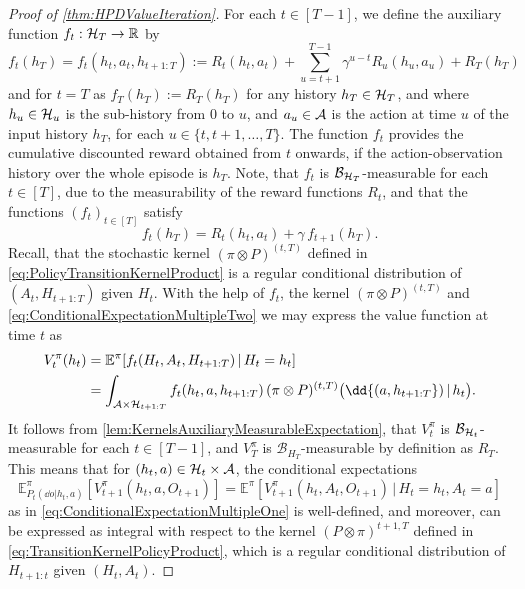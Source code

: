 \documentclass[
    a4paper,
    11pt,
    bibliography=totoc,
    listof=totoc,      
    headinclude=true,
    cleardoublepage=empty,
]{scrbook}
\theoremstyle{plain}
\theoremstyle{definition}
\theoremstyle{remark}
\newcommand{\SetR}{\mathbb R}
\newcommand{\E}{\mathbb E}
\newcommand{\SpaceA}{{\cal A}}
\newcommand{\SpaceH}{{\cal H}}
\begin{document}
\begin{proof}[Proof of \cref{thm:HPDValueIteration}]
    For each $t\in[T-1]$, we define the auxiliary function $f_t:\SpaceH_T \to 
    \SetR$ by
    \begin{equation}
    \label{eq:AuxiliaryRewardFunction}
        f_t(h_T) = f_t(h_{t},a_t,h_{t+1:T}) 
        := R_t(h_t,a_t) + \sum_{u=t+1}^{T-1} 
            \gamma^{u-t} R_u(h_u,a_u) + R_T(h_T)
    \end{equation}
    and for $t=T$ as $f_T(h_T) := R_T(h_T)$ for any history $h_T\in\SpaceH_T$, 
    and where $h_u\in\SpaceH_u$ is the sub-history from $0$ to $u$, and
    $a_u\in\SpaceA$ is the action at time $u$ of the input history $h_T$, for 
    each $u\in\{t, t+1,\dots, T\}$. The function $f_t$ provides the cumulative 
    discounted reward obtained from $t$ onwards, if the action-observation 
    history over the whole episode is $h_T$. Note, that $f_t$ is 
    $\mathcal{B}_{\SpaceH_T}$-measurable for each $t\in[T]$, due to the 
    measurability of the reward functions $R_t$, and that the functions 
    $(f_t)_{t\in[T]}$ satisfy
    \begin{equation}    
    \label{eq:AuxiliaryRewardFunctionRecursion}
        f_t(h_T) = R_t(h_t,a_t) + \gamma\, f_{t+1}(h_T).
    \end{equation}
    Recall, that the stochastic kernel $(\pi\otimes P)^{(t,T)}$ defined in 
    \cref{eq:PolicyTransitionKernelProduct} is a regular conditional 
    distribution of $(A_t,H_{t+1:T})$ given $H_t$. With the help of $f_t$, the 
    kernel $(\pi\otimes P)^{(t,T)}$ and 
    \cref{eq:ConditionalExpectationMultipleTwo} we may express the value 
    function at time $t$ as
    \begin{equation}   
    \label{eq:HDPValueFunctionIntegral}
    \begin{split}
    V^{\pi}_t(h_t) 
    &= \E^\pi[f_t(H_t,A_t,H_{t+1:T}) \,|\, H_t=h_t] \\
    &= \int_{\SpaceA\times\SpaceH_{t+1:T}}
            f_t(h_t, a, h_{t+1:T})\, 
                (\pi\otimes P)^{(t,T)}\bigl(\dd{(a,h_{t+1:T}}) \,|\, h_t\bigr).
    \end{split}
    \end{equation}
    It follows from \cref{lem:KernelsAuxiliaryMeasurableExpectation}, that 
    $V^\pi_t$ is $\mathcal{B}_{\SpaceH_t}$-measurable for each $t\in[T-1]$, 
    and $V^\pi_T$ is $\mathcal{B}_{H_T}$-measurable by definition as $R_T$.
    This means that for $(h_t,a)\in\SpaceH_t\times\SpaceA$, the conditional 
    expectations
    \[
        \E^\pi_{P_t(\dd{o}|h_t,a)}[V^\pi_{t+1}(h_{t},a,O_{t+1})]
        =\E^\pi[V^\pi_{t+1}(h_{t},A_t,O_{t+1})\,|\,H_t=h_t,A_t=a]
    \]
    as in \cref{eq:ConditionalExpectationMultipleOne} is well-defined, and 
    moreover, can be expressed as integral with respect to the kernel 
    $(P\otimes\pi)^{t+1,T}$ defined in 
    \eqref{eq:TransitionKernelPolicyProduct}, which is a regular conditional 
    distribution of $H_{t+1:t}$ given $(H_t,A_t)$.


\end{proof}
\end{document}
